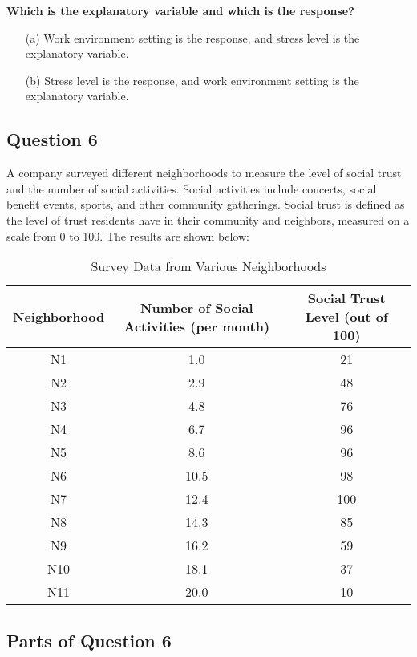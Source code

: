 \documentclass{article}
\begin{document}
\textbf{Which is the explanatory variable and which is the response?}
\begin{enumerate}
    \item[(a)] Work environment setting is the response, and stress level is the explanatory variable.
    \item[(b)] Stress level is the response, and work environment setting is the explanatory variable.
\end{enumerate}

\subsection*{Question 6}

A company surveyed different neighborhoods to measure the level of social trust and the number of social activities. Social activities include concerts, social benefit events, sports, and other community gatherings. Social trust is defined as the level of trust residents have in their community and neighbors, measured on a scale from 0 to 100. The results are shown below:

\begin{table}[h!]
\centering
\begin{tabular}{|c|c|c|}
\hline
Neighborhood & Number of Social Activities (per month) & Social Trust Level (out of 100) \\
\hline
N1 & 1.0 & 21 \\
N2 & 2.9 & 48 \\
N3 & 4.8 & 76 \\
N4 & 6.7 & 96 \\
N5 & 8.6 & 96 \\
N6 & 10.5 & 98 \\
N7 & 12.4 & 100 \\
N8 & 14.3 & 85 \\
N9 & 16.2 & 59 \\
N10 & 18.1 & 37 \\
N11 & 20.0 & 10 \\
\hline
\end{tabular}
\caption{Survey Data from Various Neighborhoods}
\end{table}

\subsection*{Parts of Question 6}
\end{document}
